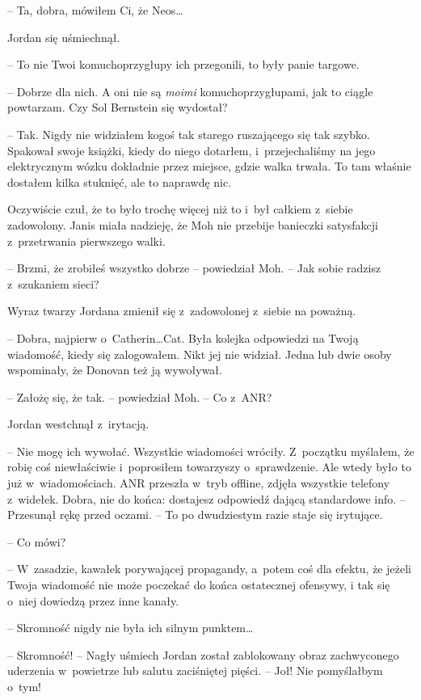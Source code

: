 \documentclass[oneside,polish,11pt,sfheadings]{mwbk}
\begin{document}
-- Ta, dobra, mówiłem Ci, że Neos\ldots

Jordan się uśmiechnął. 

-- To nie Twoi komuchoprzygłupy ich przegonili, to
były panie targowe.

-- Dobrze dla nich. A oni nie są \emph{moimi }komuchoprzygłupami, jak to
ciągle powtarzam. Czy Sol Bernstein się wydostał?

-- Tak. Nigdy nie widziałem kogoś tak starego ruszającego się tak szybko.
Spakował swoje książki, kiedy do niego dotarłem, i~przejechaliśmy na
jego elektrycznym wózku dokładnie przez miejsce, gdzie walka trwała. To
tam właśnie dostałem kilka stuknięć, ale to naprawdę nic.

Oczywiście czuł, że to było trochę więcej niż to i~był całkiem z~siebie
zadowolony. Janis miała nadzieję, że Moh nie przebije banieczki
satysfakcji z~przetrwania pierwszego walki.

-- Brzmi, że zrobiłeś wszystko dobrze -- powiedział Moh. -- Jak sobie
radzisz z~szukaniem sieci?

Wyraz twarzy Jordana zmienił się z~zadowolonej z~siebie na poważną.

-- Dobra, najpierw o~Catherin\ldots Cat. Była kolejka odpowiedzi na Twoją
wiadomość, kiedy się zalogowałem. Nikt jej nie widział. Jedna lub dwie
osoby wspominały, że Donovan też ją wywoływał.

-- Założę się, że tak. -- powiedział Moh. -- Co z~ANR?

Jordan westchnął z~irytacją. 

-- Nie mogę ich wywołać. Wszystkie
wiadomości wróciły. Z~początku myślałem, że robię coś niewłaściwie i~poprosiłem towarzyszy o~sprawdzenie. Ale wtedy było to już w~wiadomościach. ANR przeszła w~tryb offline, zdjęła wszystkie telefony z~widełek. Dobra, nie do końca: dostajesz odpowiedź dającą standardowe
info. -- Przesunął rękę przed oczami. -- To po dwudziestym razie staje się
irytujące.

-- Co mówi?

-- W~zasadzie, kawałek porywającej propagandy, a~potem coś dla efektu, że
jeżeli Twoja wiadomość nie może poczekać do końca ostatecznej ofensywy,
i tak się o~niej dowiedzą przez inne kanały.

-- Skromność nigdy nie była ich silnym punktem\ldots

-- Skromność! -- Nagły uśmiech Jordan został zablokowany obraz
zachwyconego uderzenia w~powietrze lub salutu zaciśniętej pięści. -- Joł!
Nie pomyślałbym o~tym!
\end{document}
